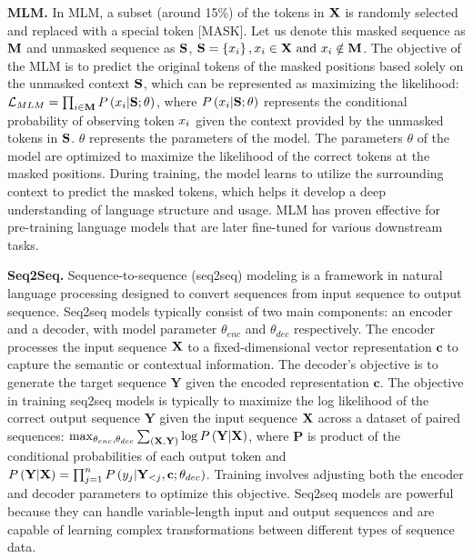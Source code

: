 \textbf{MLM.}
In MLM, a subset (around 15\%) of the tokens in $\mathbf{X}$ is randomly selected and replaced with a special token [MASK].
Let us denote this masked sequence as $\mathbf{M}$ and unmasked sequence as $\mathbf{S}$, $\mathbf{S}=\left\{x_i\right\},x_i\in \mathbf{X}~\text{and}~ x_i\notin \mathbf{M}$.
The objective of the MLM is to predict the original tokens of the masked positions based solely on the unmasked context $\mathbf{S}$, which can be represented as maximizing the likelihood: $\mathcal{L}_{MLM}=\prod_{i\in \mathbf{M}} P \left( {{x}_i|\mathbf{S};\theta} \right) $, where 
$P \left( {{x}_i|\mathbf{S};\theta} \right) $ represents the conditional probability of observing token ${x}_i$ given the context provided by the unmasked tokens in $\mathbf{S}$.
$\theta$ represents the parameters of the model.
The parameters  $\theta$ of the model 
are optimized to maximize the likelihood of the correct tokens at the masked positions.
During training, the model learns to utilize the surrounding context to predict the masked tokens, which helps it develop a deep understanding of language structure and usage.
MLM has proven effective for pre-training language models that are later fine-tuned for various downstream tasks.













\textbf{Seq2Seq.}
Sequence-to-sequence (seq2seq) modeling is a framework in natural language processing designed to convert sequences from input sequence to output sequence.
Seq2seq models typically consist of two main components: an encoder and a decoder, with model parameter $\theta_{enc}$ and $\theta_{dec}$ respectively. 
The encoder processes the input sequence $\mathbf{X}$ to a fixed-dimensional vector representation $\mathbf{c}$ 
to capture the semantic or contextual information. The decoder's objective is to generate the target sequence $\mathbf{Y}$ given the encoded representation $\mathbf{c}$. 
The objective in training seq2seq models is typically to maximize the log likelihood of the correct output sequence $\mathbf{Y}$ given the input sequence $\mathbf{X}$ across a dataset of paired sequences:
$\max_{\theta_{enc},\theta_{dec}}\sum_{ \left( {\mathbf{X},\mathbf{Y}} \right) }\log P \left( {\mathbf{Y}|\mathbf{X}} \right) $, where $\mathbf{P}$ is product of the conditional probabilities of each output token and
$P \left( {\mathbf{Y}|\mathbf{X}} \right) =\prod^n_{j=1}P \left( {y_j|\mathbf{Y}_{<j},\mathbf{c};\theta_{dec}} \right) $.
Training involves adjusting both the encoder and decoder parameters to optimize this objective.
Seq2seq models are powerful because they can handle variable-length input and output sequences and are capable of learning complex transformations between different types of sequence data.




